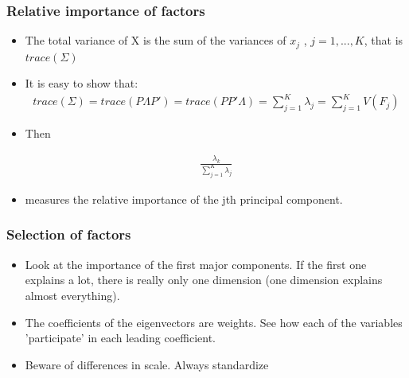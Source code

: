\documentclass[
  shownotes,
  xcolor={svgnames},
  hyperref={colorlinks,citecolor=DarkBlue,linkcolor=DarkRed,urlcolor=DarkBlue}
  , aspectratio=169]{beamer}
\begin{document}
\begin{frame}
\frametitle{Relative importance of factors}
\begin{itemize}


\item The total variance of X is the sum of the variances of $x_j$ , $j = 1, ..., K$, that is $trace(\Sigma)$
\item It is easy to show that:
\begin{align}
trace(\Sigma) = trace(P \Lambda P')= trace(PP' \Lambda ) = \sum_{j=1}^K \lambda_j= \sum_{j=1}^K V(F_j)
\end{align}
\item Then

\begin{align}
\frac{\lambda_k}{\sum_{j=1}^K \lambda_j}
\end{align}

\item measures the relative importance of the jth principal component.
\end{itemize}
\end{frame}

\begin{frame}
\frametitle{Selection of factors}

\begin{itemize}


\item Look at the importance of the first major components. If the first one explains a lot, there is really only one dimension (one dimension explains almost everything).
\bigskip
\item The coefficients of the eigenvectors are weights. See how each of the variables 'participate' in each leading coefficient.
\bigskip
\item Beware of differences in scale. Always standardize 
\end{itemize}
\end{frame}
\end{document}
